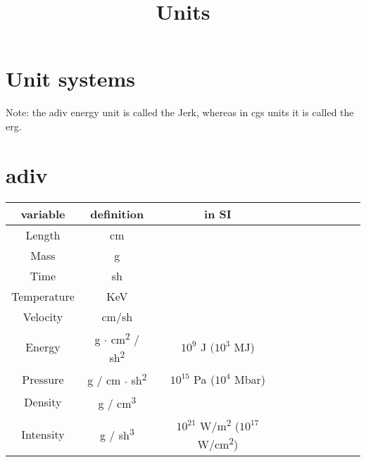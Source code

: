 \documentclass[11pt]{article}
\title{Units}
\begin{document}
\maketitle

\setlength{\cellspacetoplimit}{3pt}
\setlength{\cellspacebottomlimit}{3pt}

\section{Unit systems}
Note: the adiv energy unit is called the Jerk, whereas in cgs units it is called the erg.
\section{adiv}

\begin{center}
    \begin{tabular}{|Sc|Sc|Sc|Sc|Sc|}
        \hline
        variable & definition & in SI \\
        \hline 
        Length & cm & \\
        \hline
        Mass & g & \\
        \hline
        Time & sh & \\
        \hline
        Temperature & KeV & \\
        \hline
        Velocity & cm/sh & \\
        \hline
        Energy & g \( \cdot \) cm\textsuperscript{2} / sh\textsuperscript{2} & $10^9$ J  $(10^3$ MJ)\\
        \hline 
        Pressure & g / cm \( \cdot \) sh\textsuperscript{2} & $10^{15}$ Pa ($10^4$ Mbar) \\
        \hline
        Density & g / cm\textsuperscript{3} & \\
        \hline 
        Intensity & g / sh\textsuperscript{3} & $10^{21}$ W/m\textsuperscript{2} ($10^{17}$ W/cm\textsuperscript{2}) \\
        \hline
    \end{tabular}
\end{center}
\end{document}
